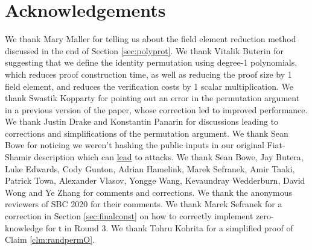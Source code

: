 \documentclass[11pt]{article} %
\newcommand{\chalpoint}{\ensuremath{\mathfrak{z}}\xspace}
\newcommand{\sigpolyevala}{\ensuremath{\mathsf{\bar{s}_{\sigma1}}}\xspace}
\newcommand{\sigpolyevalb}{\ensuremath{\mathsf{\bar{s}_{\sigma2}}}\xspace}
\newcommand{\sigcomma}{\ensuremath{[s_{\mathsf{\sigma1}}]_1}\xspace}
\newcommand{\sigcommb}{\ensuremath{[s_{\mathsf{\sigma2}}]_1}\xspace}
\begin{document}



 \section*{Acknowledgements} We thank Mary Maller for telling us about the field element reduction method discussed in the end of Section \ref{sec:polyprot}. We thank Vitalik Buterin for suggesting that we define the identity permutation using degree-1 polynomials, which reduces proof construction time, as well as reducing the proof size by 1 field element, and reduces the verification costs by 1 scalar multiplication. We thank Swastik Kopparty for pointing out an error in the permutation argument in a previous version of the paper, whose correction led to improved performance. We thank Justin Drake and Konstantin Panarin for discussions leading to corrections and simplifications of the permutation argument. We thank Sean Bowe for noticing we weren't hashing the public inputs in our original Fiat-Shamir description which can \href{https://blog.trailofbits.com/2022/04/18/the-frozen-heart-vulnerability-in-plonk/}{lead} to attacks. We thank Sean Bowe, Jay Butera, Luke Edwards, Cody Gunton, Adrian Hamelink, Marek Sefranek, Amir Taaki, Patrick Towa, Alexander Vlasov, Yongge Wang, Kevaundray Wedderburn, David Wong and Ye Zhang for comments and corrections. We thank the anonymous reviewers of SBC 2020 for their comments. We thank Marek Sefranek for a correction in Section \ref{sec:finalconst} on how to correctly implement zero-knowledge for $\mathsf{t}$ in Round 3. We thank Tohru Kohrita for a simplified proof of Claim \ref{clm:randpermO}.  

    
\end{document}
